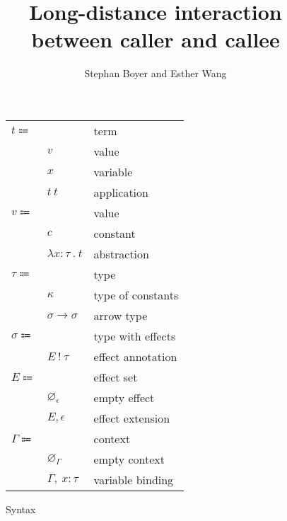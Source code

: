 \documentclass[12pt]{article}
\title{Long-distance interaction \\ between caller and callee}
\author{Stephan Boyer and Esther Wang}
\date{}
\newcommand\eterm{t}
\newcommand\evalue{v}
\newcommand\econst{c}
\newcommand\evar{x}
\newcommand\eabs[2]{\lambda #1 \ . \ #2}
\newcommand\eapp[2]{#1 \ #2}
\newcommand\ttype{\tau}
\newcommand\tconst{\kappa}
\newcommand\tarrow[2]{#1 \rightarrow #2}
\newcommand\tanno[2]{#1 : #2}
\newcommand\twithx{\sigma}
\newcommand\tx[2]{#1 \ ! \ #2}
\newcommand\xeffect{\epsilon}
\newcommand\xeffects{E}
\newcommand\xempty{\varnothing_{\xeffect}}
\newcommand\xextend[2]{#1, #2}
\newcommand\ccontext{\Gamma}
\newcommand\cempty{\varnothing_{\ccontext}}
\newcommand\cextend[3]{#1, \ \tanno{#2}{#3}}
\begin{document}
  \maketitle

  \begin{figure}
    \begin{mdframed}
      \begin{center}
        \begin{tabular}{l l l}
          $\eterm \Coloneqq $ & & term \\
          & $\evalue$ & value \\
          & $\evar$ & variable \\
          & $\eapp{\eterm}{\eterm}$ & application \\
          $\evalue \Coloneqq $ & & value \\
          & $\econst$ & constant \\
          & $\eabs{\tanno{\evar}{\ttype}}{\eterm}$ & abstraction \\
          $\ttype \Coloneqq$ & & type \\
          & $\tconst$ & type of constants \\
          & $\tarrow{\twithx}{\twithx}$ & arrow type \\
          $\twithx \Coloneqq$ & & type with effects \\
          & $\tx{\xeffects}{\ttype}$ & effect annotation \\
          $\xeffects \Coloneqq$ & & effect set \\
          & $\xempty$ & empty effect \\
          & $\xextend{\xeffects}{\xeffect}$ & effect extension \\
          $\ccontext \Coloneqq$ & & context \\
          & $\cempty$ & empty context \\
          & $\cextend{\ccontext}{\evar}{\ttype}$ & variable binding \\
        \end{tabular}
      \end{center}

      \caption{Syntax}
      \label{fig:syntax}
    \end{mdframed}
  \end{figure}
\end{document}
